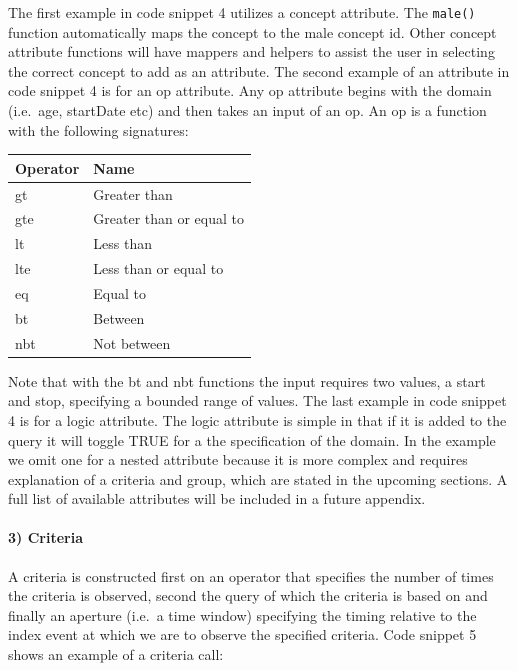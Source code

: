 \documentclass[
]{article}
\newcounter{none} %
\begin{document}
The first example in code snippet 4 utilizes a concept attribute. The
\texttt{male()} function automatically maps the concept to the male
concept id. Other concept attribute functions will have mappers and
helpers to assist the user in selecting the correct concept to add as an
attribute. The second example of an attribute in code snippet 4 is for
an op attribute. Any op attribute begins with the domain (i.e.~age,
startDate etc) and then takes an input of an op. An op is a function
with the following signatures:

{\def\LTcaptype{none} %
\begin{longtable}[]{@{}ll@{}}
\toprule\noalign{}
Operator & Name \\
\midrule\noalign{}
\endhead
\bottomrule\noalign{}
\endlastfoot
gt & Greater than \\
gte & Greater than or equal to \\
lt & Less than \\
lte & Less than or equal to \\
eq & Equal to \\
bt & Between \\
nbt & Not between \\
\end{longtable}
}

Note that with the bt and nbt functions the input requires two values, a
start and stop, specifying a bounded range of values. The last example
in code snippet 4 is for a logic attribute. The logic attribute is
simple in that if it is added to the query it will toggle TRUE for a the
specification of the domain. In the example we omit one for a nested
attribute because it is more complex and requires explanation of a
criteria and group, which are stated in the upcoming sections. A full
list of available attributes will be included in a future appendix.

\paragraph{3) Criteria}\label{criteria}

A criteria is constructed first on an operator that specifies the number
of times the criteria is observed, second the query of which the
criteria is based on and finally an aperture (i.e.~a time window)
specifying the timing relative to the index event at which we are to
observe the specified criteria. Code snippet 5 shows an example of a
criteria call:
\end{document}
